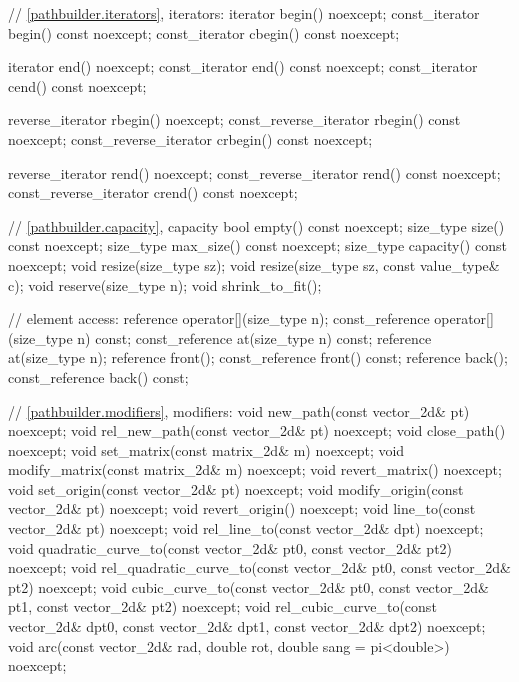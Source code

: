 \begin{codeblock}
{{    // \ref{pathbuilder.iterators}, iterators:
    iterator begin() noexcept;
    const_iterator begin() const noexcept;
    const_iterator cbegin() const noexcept;

    iterator end() noexcept;
    const_iterator end() const noexcept;
    const_iterator cend() const noexcept;
    
    reverse_iterator rbegin() noexcept;
    const_reverse_iterator rbegin() const noexcept;
    const_reverse_iterator crbegin() const noexcept;

    reverse_iterator rend() noexcept;
    const_reverse_iterator rend() const noexcept;
    const_reverse_iterator crend() const noexcept;
    
    // \ref{pathbuilder.capacity}, capacity
    bool empty() const noexcept;
    size_type size() const noexcept;
    size_type max_size() const noexcept;
    size_type capacity() const noexcept;
    void resize(size_type sz);
    void resize(size_type sz, const value_type& c);
    void reserve(size_type n);
    void shrink_to_fit();

    // element access:
    reference operator[](size_type n);
    const_reference operator[](size_type n) const;
    const_reference at(size_type n) const;
    reference at(size_type n);
    reference front();
    const_reference front() const;
    reference back();
    const_reference back() const;

    // \ref{pathbuilder.modifiers}, modifiers:
    void new_path(const vector_2d& pt) noexcept;
    void rel_new_path(const vector_2d& pt) noexcept;
    void close_path() noexcept;
    void set_matrix(const matrix_2d& m) noexcept;
    void modify_matrix(const matrix_2d& m) noexcept;
    void revert_matrix() noexcept;
    void set_origin(const vector_2d& pt) noexcept;
    void modify_origin(const vector_2d& pt) noexcept;
    void revert_origin() noexcept;
    void line_to(const vector_2d& pt) noexcept;
    void rel_line_to(const vector_2d& dpt) noexcept;
    void quadratic_curve_to(const vector_2d& pt0, const vector_2d& pt2)
      noexcept;
    void rel_quadratic_curve_to(const vector_2d& pt0, const vector_2d& pt2)
      noexcept;
    void cubic_curve_to(const vector_2d& pt0, const vector_2d& pt1,
      const vector_2d& pt2) noexcept;
    void rel_cubic_curve_to(const vector_2d& dpt0, const vector_2d& dpt1,
      const vector_2d& dpt2) noexcept;
    void arc(const vector_2d& rad, double rot, double sang = pi<double>)
      noexcept;
    
}}
\end{codeblock}

